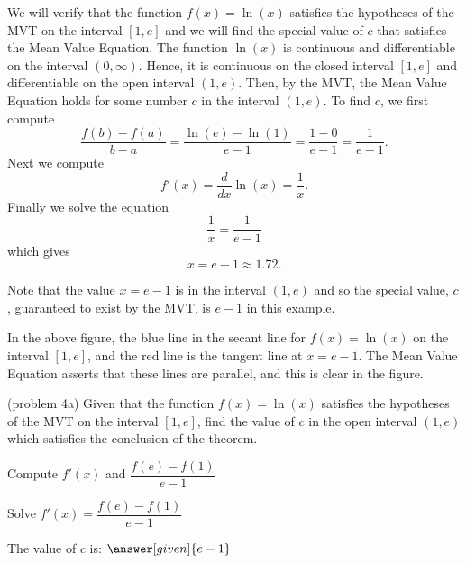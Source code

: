 \documentclass{ximera}
\begin{document}
\begin{example}[example 4] %
We will verify that the function $f(x) = \ln(x)$ satisfies the hypotheses of the MVT
on the interval $[1,e]$ and we will find the special value of $c$ that satisfies the Mean Value Equation.
The function $\ln(x)$ is continuous and differentiable on the interval $(0, \infty)$. 
Hence, it is continuous on the closed interval $[1, e]$ and differentiable on the open interval $(1, e)$. 
Then, by the MVT,  the Mean Value Equation holds for some number 
$c$ in the interval $(1, e)$. To find $c$, we first compute
\[\frac{f(b) - f(a)}{b-a} = \frac{\ln(e) - \ln(1)}{e-1} = \frac{1 - 0}{e-1} = \frac{1}{e-1}.\]
Next we compute
\[f'(x) = \frac{d}{dx} \ln(x) = \frac{1}{x}.\]
Finally we solve the equation
\[\frac{1}{x} = \frac{1}{e-1}\]
which gives
\[ x = e-1 \approx 1.72.\]

Note that the value $x = e-1$ is in the interval $(1,e)$ and so the special value, $c$, 
guaranteed to exist by the MVT,
is $e-1$ in this example.


\begin{image}
\end{image}

In the above figure, the blue line in the secant line for $f(x) = \ln(x)$ on the interval $[1, e]$, 
and the red line is the tangent line at $x = e-1$. 
The Mean Value Equation asserts that these lines are parallel, and this
is clear in the figure.
\end{example}

\begin{problem}(problem 4a) 
  Given that the function $f(x) = \ln(x)$ satisfies the hypotheses of the MVT on the
	interval $[1,e]$, find the value of $c$ in the open interval $(1,e)$ which satisfies 
	the conclusion of the theorem.
	
    \begin{hint}
      Compute $f'(x)$ and $\dfrac{f(e) - f(1)}{e-1}$
    \end{hint}
		\begin{hint}
		  Solve $f'(x) = \dfrac{f(e) - f(1)}{e-1}$
		\end{hint}
		
		The value of $c$ is:
		 $\answer[given]{e-1}$
\end{problem}
\end{document}
